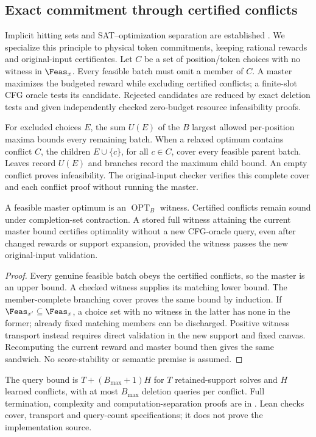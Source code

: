 \subsection{Exact commitment through certified conflicts}
\label{sec:conflicts}

Implicit hitting sets and SAT--optimization separation are established
\cite{davies2011maxhs,saikko2016lmhs}. We specialize this principle to physical
token commitments, keeping rational rewards and original-input certificates.
Let $C$ be a set of position/token choices with no witness in $\Feas_x$.
Every feasible batch must omit a member of $C$. A master maximizes the budgeted
reward while excluding certified conflicts; a finite-slot CFG oracle tests its
candidate. Rejected candidates are reduced by exact deletion tests and given
independently checked zero-budget resource infeasibility proofs.

For excluded choices $E$, the sum $U(E)$ of the $B$ largest allowed
per-position maxima bounds every remaining batch. When a relaxed optimum
contains conflict $C$, the children $E\cup\{c\}$, for all $c\in C$, cover every
feasible parent batch. Leaves record $U(E)$ and branches record the maximum
child bound. An empty conflict proves infeasibility. The original-input checker
verifies this complete cover and each conflict proof without running the master.

\begin{theorem}
A feasible master optimum is an $\operatorname{OPT}_B$ witness. Certified
conflicts remain sound under completion-set contraction. A stored full witness
attaining the current master bound certifies optimality without a new CFG-oracle
query, even after changed rewards or support expansion, provided the witness
passes the new original-input validation.
\label{thm:conflict-reuse}
\end{theorem}
\begin{proof}
Every genuine feasible batch obeys the certified conflicts, so the master is an
upper bound. A checked witness supplies its matching lower bound. The
member-complete branching cover proves the same bound by induction. If
$\Feas_{x'}\subseteq\Feas_x$, a choice set with no witness in the latter has none
in the former; already fixed matching members can be discharged. Positive
witness transport instead requires direct validation in the new support and
fixed canvas. Recomputing the current reward and master bound then gives the
same sandwich. No score-stability or semantic premise is assumed.
\end{proof}

The query bound is $T+(B_{\max}+1)H$ for $T$ retained-support solves and $H$
learned conflicts, with at most $B_{\max}$ deletion queries per conflict.
Full termination, complexity and computation-separation proofs are in
. Lean checks cover, transport
and query-count specifications; it does not prove the implementation source.

